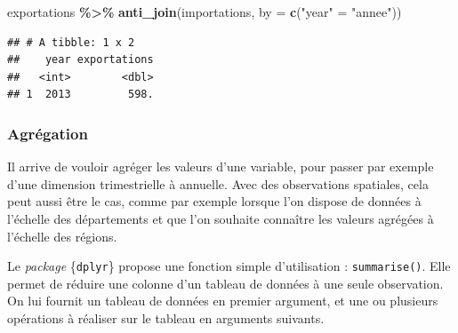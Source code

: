\documentclass[
  11pt,
]{book}
\newenvironment{Shaded}{\begin{snugshade}}{\end{snugshade}}
\newcommand{\DataTypeTok}[1]{\textcolor[rgb]{0.13,0.29,0.53}{#1}}
\newcommand{\KeywordTok}[1]{\textcolor[rgb]{0.13,0.29,0.53}{\textbf{#1}}}
\newcommand{\NormalTok}[1]{#1}
\newcommand{\OperatorTok}[1]{\textcolor[rgb]{0.81,0.36,0.00}{\textbf{#1}}}
\newcommand{\StringTok}[1]{\textcolor[rgb]{0.31,0.60,0.02}{#1}}
\numberwithin{equation}{section}
\numberwithin{countremarque}{section}
\begin{document}
\begin{Shaded}
\begin{Highlighting}[]
\NormalTok{exportations }\OperatorTok{\%\textgreater{}\%}\StringTok{ }\KeywordTok{anti\_join}\NormalTok{(importations, }\DataTypeTok{by =} \KeywordTok{c}\NormalTok{(}\StringTok{"year"}\NormalTok{ =}\StringTok{ "annee"}\NormalTok{))}
\end{Highlighting}
\end{Shaded}

\begin{lstlisting}
## # A tibble: 1 x 2
##    year exportations
##   <int>        <dbl>
## 1  2013         598.
\end{lstlisting}

\hypertarget{agruxe9gation}{%
\subsubsection{Agrégation}\label{agruxe9gation}}

Il arrive de vouloir agréger les valeurs d'une variable, pour passer par exemple d'une dimension trimestrielle à annuelle. Avec des observations spatiales, cela peut aussi être le cas, comme par exemple lorsque l'on dispose de données à l'échelle des départements et que l'on souhaite connaître les valeurs agrégées à l'échelle des régions.

Le \emph{package} \{\texttt{dplyr}\} propose une fonction simple d'utilisation : \texttt{summarise()}. Elle permet de réduire une colonne d'un tableau de données à une seule observation. On lui fournit un tableau de données en premier argument, et une ou plusieurs opérations à réaliser sur le tableau en arguments suivants.
\end{document}
